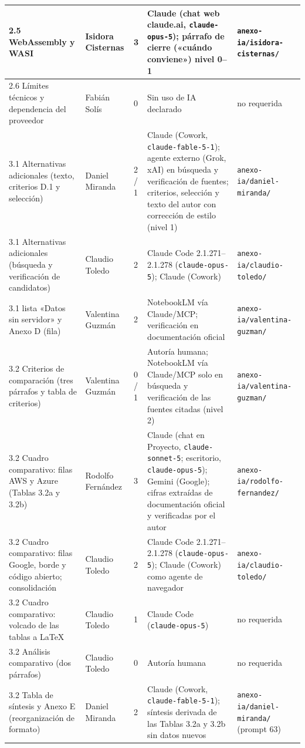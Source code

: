 \documentclass[12pt, letterpaper, table, xcdraw]{inf-pucv}
\begin{document}
{\begin{longtable}{|p{4.2cm}|p{2.2cm}|p{0.9cm}|p{4.2cm}|p{2.4cm}|}
    2.5 WebAssembly y WASI & Isidora Cisternas & 3 & Claude (chat web claude.ai, \texttt{claude-opus-5}); párrafo de cierre («cuándo conviene») nivel 0--1 & \texttt{anexo-ia/isidora-cisternas/} \\ \hline
    2.6 Límites técnicos y dependencia del proveedor & Fabián Solís & 0 & Sin uso de IA declarado & no requerida \\ \hline
    3.1 Alternativas adicionales (texto, criterios D.1 y selección) & Daniel Miranda & 2 / 1 & Claude (Cowork, \texttt{claude-fable-5-1}); agente externo (Grok, xAI) en búsqueda y verificación de fuentes; criterios, selección y texto del autor con corrección de estilo (nivel 1) & \texttt{anexo-ia/daniel-miranda/} \\ \hline
    3.1 Alternativas adicionales (búsqueda y verificación de candidatos) & Claudio Toledo & 2 & Claude Code 2.1.271--2.1.278 (\texttt{claude-opus-5}); Claude (Cowork) & \texttt{anexo-ia/claudio-toledo/} \\ \hline
    3.1 lista «Datos sin servidor» y Anexo D (fila) & Valentina Guzmán & 2 & NotebookLM vía Claude/MCP; verificación en documentación oficial & \texttt{anexo-ia/valentina-guzman/} \\ \hline
    3.2 Criterios de comparación (tres párrafos y tabla de criterios) & Valentina Guzmán & 0 / 1 & Autoría humana; NotebookLM vía Claude/MCP solo en búsqueda y verificación de las fuentes citadas (nivel 2) & \texttt{anexo-ia/valentina-guzman/} \\ \hline
    3.2 Cuadro comparativo: filas AWS y Azure (Tablas 3.2a y 3.2b) & Rodolfo Fernández & 3 & Claude (chat en Proyecto, \texttt{claude-sonnet-5}; escritorio, \texttt{claude-opus-5}); Gemini (Google); cifras extraídas de documentación oficial y verificadas por el autor & \texttt{anexo-ia/rodolfo-fernandez/} \\ \hline
    3.2 Cuadro comparativo: filas Google, borde y código abierto; consolidación & Claudio Toledo & 2 & Claude Code 2.1.271--2.1.278 (\texttt{claude-opus-5}); Claude (Cowork) como agente de navegador & \texttt{anexo-ia/claudio-toledo/} \\ \hline
    3.2 Cuadro comparativo: volcado de las tablas a \LaTeX & Claudio Toledo & 1 & Claude Code (\texttt{claude-opus-5}) & no requerida \\ \hline
    3.2 Análisis comparativo (dos párrafos) & Claudio Toledo & 0 & Autoría humana & no requerida \\ \hline
    3.2 Tabla de síntesis y Anexo E (reorganización de formato) & Daniel Miranda & 2 & Claude (Cowork, \texttt{claude-fable-5-1}); síntesis derivada de las Tablas 3.2a y 3.2b sin datos nuevos & \texttt{anexo-ia/daniel-miranda/} (prompt 63) \\ \hline

\end{longtable}}
\end{document}
